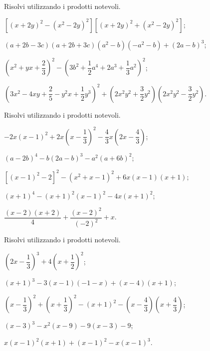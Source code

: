 \begin{esercizio}
 \label{ese:12.34}
Risolvi utilizzando i prodotti notevoli.
 \begin{enumeratea}
 \item $\left[\left(x+2y\right)^{2}-\left(x^{2}-2y\right)^{2}\right]\left[\left(x+2y\right)^{2}+\left(x^{2}-2y\right)^{2}\right]$;
 \item $(a+2b-3c)(a+2b+3c)\left(a^{2}-b\right)\left(-a^{2}-b\right)+(2a-b)^{3}$;
 \item $\left(x^{2}+yx+\dfrac{2}{3}\right)^{2}-\left(3b^{2}+\dfrac{1}{2}a^{4}+2a^{3}+\dfrac{1}{3}a^{2}\right)^{2}$;
 \item $\left(3x^{2}-4{xy}+\dfrac{2}{5}-y^{2}x+\dfrac{1}{2}y^{3}\right)^{2}+\left(2x^{2}y^{2}+\dfrac{3}{2}y^{2}\right)\left(2x^{2}y^{2}-\dfrac{3}{2}y^{2}\right)$.
 \end{enumeratea}
\end{esercizio}

\begin{esercizio}[\Ast]
 \label{ese:12.35}
Risolvi utilizzando i prodotti notevoli.
 \begin{enumeratea}
 \item $-2x(x-1)^{2}+2x\left(x-\dfrac{1}{3}\right)^{2}-\dfrac{4}{3}x\left(2x-\dfrac{4}{3}\right)$;
 \item $(a-2b)^{4}-b(2a-b)^{3}-a^{2}(a+6b)^{2}$;
 \item $[(x-1)^2-2]^2-\left(x^2+x-1\right)^2+6x(x-1)(x+1)$;
 \item $(x+1)^{4}-(x+1)^{2}(x-1)^{2}-4x(x+1)^{2}$;
 \item $\dfrac{(x-2)(x+2)}{4}+\dfrac{(x-2)^{2}}{(-2)^{2}}+x$.
 \end{enumeratea}
\end{esercizio}

\begin{esercizio}[\Ast]
 \label{ese:12.36}
Risolvi utilizzando i prodotti notevoli.
 \begin{enumeratea}
 \item $\left(2x-\dfrac{1}{3}\right)^{3}+4\left(x+\dfrac{1}{2}\right)^{2}$;
 \item $(x+1)^{3}-3(x-1)(-1-x)+(x-4)(x+1)$;
 \item $\left(x-\dfrac{1}{3}\right)^{2}+\left(x+\dfrac{1}{3}\right)^{2}-(x+1)^{2}-\left(x-\dfrac{4}{3}\right)\left(x+\dfrac{4}{3}\right)$;
 \item $(x-3)^{3}-x^{2}(x-9)-9(x-3)-9$;
 \item $x(x-1)^{2}(x+1)+(x-1)^{2}-x(x-1)^{3}$.
 \end{enumeratea}
\end{esercizio}

